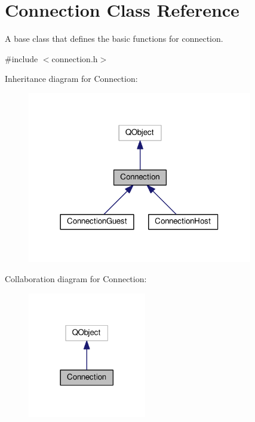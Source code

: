 \hypertarget{classMODEL_1_1Connection}{}\section{Connection Class Reference}
\label{classMODEL_1_1Connection}


A base class that defines the basic functions for connection.  




{\ttfamily \#include $<$connection.\+h$>$}



Inheritance diagram for Connection\+:\nopagebreak
\begin{figure}[H]
\begin{center}
\leavevmode
\includegraphics[width=278pt]{classMODEL_1_1Connection__inherit__graph}
\end{center}
\end{figure}


Collaboration diagram for Connection\+:\nopagebreak
\begin{figure}[H]
\begin{center}
\leavevmode
\includegraphics[width=146pt]{classMODEL_1_1Connection__coll__graph}
\end{center}
\end{figure}
